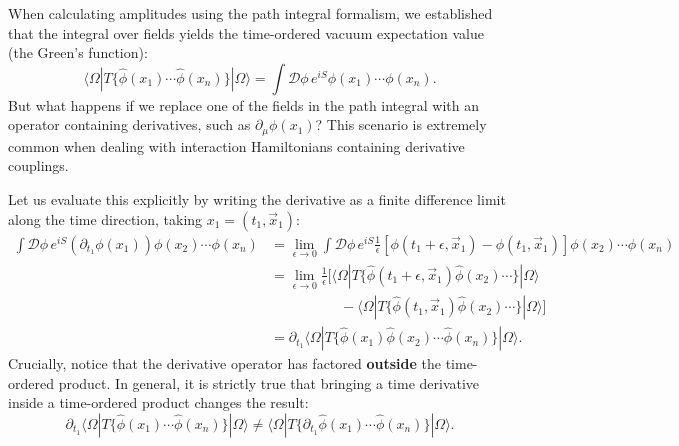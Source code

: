 When calculating amplitudes using the path integral formalism, we established that the integral over fields yields the time-ordered vacuum expectation value (the Green's function):
\[
    \langle \Omega | T \{ \hat{\phi}(x_1) \cdots \hat{\phi}(x_n) \} | \Omega \rangle = \int \mathcal{D}\phi \, e^{iS} \phi(x_1) \cdots \phi(x_n).
\]
But what happens if we replace one of the fields in the path integral with an operator containing derivatives, such as $\partial_\mu \phi(x_1)$? This scenario is extremely common when dealing with interaction Hamiltonians containing derivative couplings.

Let us evaluate this explicitly by writing the derivative as a finite difference limit along the time direction, taking $x_1 = (t_1, \vec{x}_1)$:
\[
    \begin{aligned}
        \int \mathcal{D}\phi \, e^{iS} (\partial_{t_1} \phi(x_1)) \phi(x_2) \cdots \phi(x_n) & = \lim_{\epsilon \to 0} \int \mathcal{D}\phi \, e^{iS} \frac{1}{\epsilon} \left[ \phi(t_1+\epsilon, \vec{x}_1) - \phi(t_1, \vec{x}_1) \right] \phi(x_2) \cdots \phi(x_n) \\
                                                                                             & = \lim_{\epsilon \to 0} \frac{1}{\epsilon} \Big[ \langle \Omega | T \{ \hat{\phi}(t_1+\epsilon, \vec{x}_1) \hat{\phi}(x_2) \cdots \} | \Omega \rangle                    \\
                                                                                             & \qquad \qquad \quad - \langle \Omega | T \{ \hat{\phi}(t_1, \vec{x}_1) \hat{\phi}(x_2) \cdots \} | \Omega \rangle \Big]                                                  \\
                                                                                             & = \partial_{t_1} \langle \Omega | T \{ \hat{\phi}(x_1) \hat{\phi}(x_2) \cdots \hat{\phi}(x_n) \} | \Omega \rangle.
    \end{aligned}
\]
Crucially, notice that the derivative operator has factored \textbf{outside} the time-ordered product. In general, it is strictly true that bringing a time derivative inside a time-ordered product changes the result:
\[
    \partial_{t_1} \langle \Omega | T \{ \hat{\phi}(x_1) \cdots \hat{\phi}(x_n) \} | \Omega \rangle \neq \langle \Omega | T \{ \partial_{t_1} \hat{\phi}(x_1) \cdots \hat{\phi}(x_n) \} | \Omega \rangle.
\]

